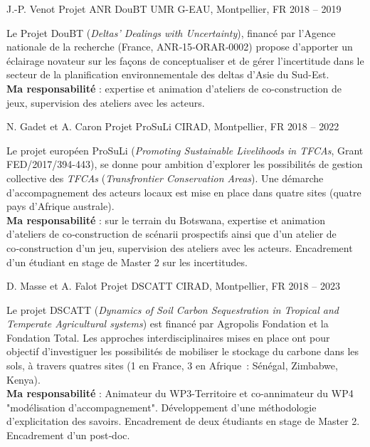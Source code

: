 \begin{cventries}
  \cventry
  {J.-P. Venot} %
  {Projet ANR DouBT} %
  {UMR G-EAU, Montpellier, FR} %
  {2018 -- 2019} %
  {
    \begin{cvitems} %
      Le Projet DouBT (\emph{Deltas' Dealings with Uncertainty}), financé par l'Agence nationale de la recherche (France, ANR‑15‑ORAR‑0002) propose d'apporter un éclairage novateur sur les façons de conceptualiser et de gérer l'incertitude dans le secteur de la planification environnementale des deltas d'Asie du Sud-Est.\\
      \textbf{Ma responsabilité} : expertise et animation d'ateliers de co-construction de jeux, supervision des ateliers avec les acteurs.
    \end{cvitems}
  }

  \cventry
  {N. Gadet et A. Caron} %
  {Projet ProSuLi} %
  {CIRAD, Montpellier, FR} %
  {2018 -- 2022} %
  {
    \begin{cvitems} %
      Le projet européen ProSuLi (\emph{Promoting Sustainable Livelihoods in TFCAs}, Grant FED/2017/394-443), se donne pour ambition d'explorer les possibilités de gestion collective des \emph{TFCAs} (\emph{Transfrontier Conservation Areas}). Une démarche d’accompagnement des acteurs locaux est mise en place dans quatre sites (quatre pays d’Afrique australe).\\
      \textbf{Ma responsabilité} : sur le terrain du Botswana, expertise et animation d’ateliers de co‑construction de scénarii prospectifs ainsi que d’un atelier de co‑construction d'un jeu, supervision des ateliers avec les acteurs. Encadrement d’un étudiant en stage de Master 2 sur les incertitudes.
    \end{cvitems}
  }

  \cventry
  {D. Masse et A. Falot} %
  {Projet DSCATT} %
  {CIRAD, Montpellier, FR} %
  {2018 -- 2023} %
  {
    \begin{cvitems} %
        Le projet DSCATT (\emph{Dynamics of Soil Carbon Sequestration in Tropical and Temperate Agricultural systems}) est financé par Agropolis Fondation et la Fondation Total. Les approches interdisciplinaires mises en place ont pour objectif d’investiguer les possibilités de mobiliser le stockage du carbone dans les sols, à travers quatres sites (1 en France, 3 en Afrique : Sénégal, Zimbabwe, Kenya).\\
        \textbf{Ma responsabilité} : Animateur du WP3-Territoire et co-annimateur du WP4 "modélisation d'accompagnement". Développement d’une méthodologie d’explicitation des savoirs. Encadrement de deux étudiants en stage de Master 2. Encadrement d’un post‑doc.
    \end{cvitems}
  }


\end{cventries}
